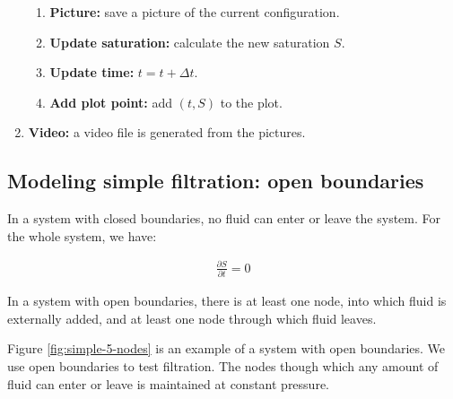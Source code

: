 \documentclass{crm-article}
\begin{document}
\begin{enumerate}
\begin{enumerate}
					\item \textbf{Picture:} save a picture of the current configuration.
					
					\item \textbf{Update saturation:} calculate the new saturation $S$.
					
					\item \textbf{Update time:} $t = t + \Delta t$.
					
					\item \textbf{Add plot point:} add $(t, S)$ to the plot.
				\end{enumerate}
				
				\item \textbf{Video:} a video file is generated from the pictures.	
			\end{enumerate}

				
		\subsection{Modeling simple filtration: open boundaries} \label{sec:model-filtration}
			In a system with closed boundaries, no fluid can enter or leave the system. For the whole system, we have:
			
			\begin{gather}
				\frac{\partial S}{\partial t} = 0
			\end{gather}
			
			In a system with open boundaries, there is at least one node, into which fluid is externally added, and at least one node through which fluid leaves.
			
			Figure \ref{fig:simple-5-nodes} is an example of a system with open boundaries. We use open boundaries to test filtration. The nodes though which any amount of fluid can enter or leave is maintained at constant pressure.
			
\end{document}
